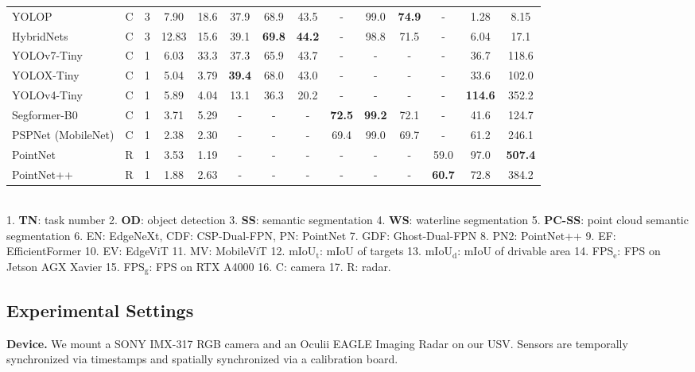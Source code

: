 \documentclass[letterpaper, 10 pt, conference]{ieeeconf}
\begin{document}
\begin{table*}
\begin{tabular}{l|cc|cc|ccc|cc|c|c|cc}
YOLOP \cite{yolop} & C & 3 & 7.90 & 18.6 & 37.9 & 68.9 & 43.5 & - & 99.0 & \textbf{74.9} & - & 1.28 & 8.15\\
HybridNets \cite{hybridnets} & C & 3 & 12.83 & 15.6 & 39.1 & \textbf{69.8} & \textbf{44.2} & - & 98.8 & 71.5 & - & 6.04 & 17.1\\
\midrule
YOLOv7-Tiny \cite{wang2022yolov7} & C &  1 & 6.03 & 33.3 & 37.3 & 65.9 & 43.7 & - & - & - & - & 36.7 & 118.6 \\
YOLOX-Tiny \cite{ge2021yolox} & C &  1 & 5.04 & 3.79 & \textbf{39.4} & 68.0 & 43.0 & - & - & - & - & 33.6 & 102.0 \\
YOLOv4-Tiny \cite{bochkovskiy2020yolov4} & C &  1 & 5.89 & 4.04 & 13.1 & 36.3 & 20.2 & - & - & - & - & \textbf{114.6} & 352.2\\
\midrule
Segformer-B0 \cite{xie2021segformer} & C &  1 & 3.71 & 5.29 & - & - & - & \textbf{72.5} & \textbf{99.2} & 72.1 & - & 41.6 & 124.7\\
PSPNet (MobileNet) \cite{zhao2017pyramid} & C &  1 & 2.38 & 2.30 & - & - & - & 69.4 & 99.0 & 69.7 & - & 61.2 & 246.1 \\
\midrule
PointNet \cite{Charles_Su_Kaichun_Guibas_2017} & R &  1 & 3.53 & 1.19 & - &- &- &- &- &- & 59.0 & 97.0 & \textbf{507.4} \\
PointNet++ \cite{Qi_Yi_Su_Guibas_2017} & R &  1 & 1.88 & 2.63 & - &- &- &- &- &- & \textbf{60.7} & 72.8 & 384.2 \\
\bottomrule
\end{tabular}
\\
\vspace{1mm}
\scriptsize{1. \textbf{TN}: task number 2. \textbf{OD}: object detection 3. \textbf{SS}: semantic segmentation 4. \textbf{WS}: waterline segmentation 5. \textbf{PC-SS}: point cloud semantic segmentation 6. EN: EdgeNeXt, CDF: CSP-Dual-FPN, PN: PointNet 7. GDF: Ghost-Dual-FPN 8. PN2: PointNet++ 9. EF: EfficientFormer 10. EV: EdgeViT 11. MV: MobileViT 12. mIoU$_{\text{t}}$: mIoU of targets 13. mIoU$_{\text{d}}$: mIoU of drivable area 14. FPS$_{\text{e}}$: FPS on Jetson AGX Xavier 15. FPS$_{\text{g}}$: FPS on RTX A4000 16. C: camera 17. R: radar.}
\end{table*}

\subsection{Experimental Settings}
 \textbf{Device.} We mount a SONY IMX-317 RGB camera and an Oculii EAGLE Imaging Radar on our USV. Sensors are temporally synchronized via timestamps and spatially synchronized via a calibration board. 
\end{document}
